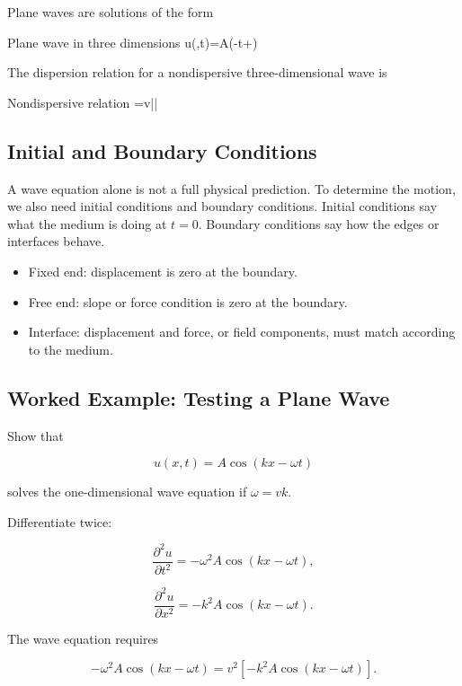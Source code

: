 \documentclass{studentnotes}
\begin{document}
Plane waves are solutions of the form

\begin{namedformula}{Plane wave in three dimensions}
    u(,t)=A\cos(\cdot{}-\omega t+\phi)
\end{namedformula}

The dispersion relation for a nondispersive three-dimensional wave is

\begin{namedformula}{Nondispersive relation}
    \omega=v||
\end{namedformula}

\subsection{Initial and Boundary Conditions}

A wave equation alone is not a full physical prediction. To determine the motion,
we also need initial conditions and boundary conditions. Initial conditions say
what the medium is doing at \(t=0\). Boundary conditions say how the edges or
interfaces behave.

\begin{itemize}
    \item Fixed end: displacement is zero at the boundary.
    \item Free end: slope or force condition is zero at the boundary.
    \item Interface: displacement and force, or field components, must match
    according to the medium.
\end{itemize}

\subsection{Worked Example: Testing a Plane Wave}

Show that

\[
    u(x,t)=A\cos(kx-\omega t)
\]

solves the one-dimensional wave equation if \(\omega=vk\).

Differentiate twice:

\[
    \frac{\partial^2u}{\partial t^2}
    =
    -\omega^2A\cos(kx-\omega t),
\]

\[
    \frac{\partial^2u}{\partial x^2}
    =
    -k^2A\cos(kx-\omega t).
\]

The wave equation requires

\[
    -\omega^2A\cos(kx-\omega t)
    =
    v^2[-k^2A\cos(kx-\omega t)].
\]
\end{document}
